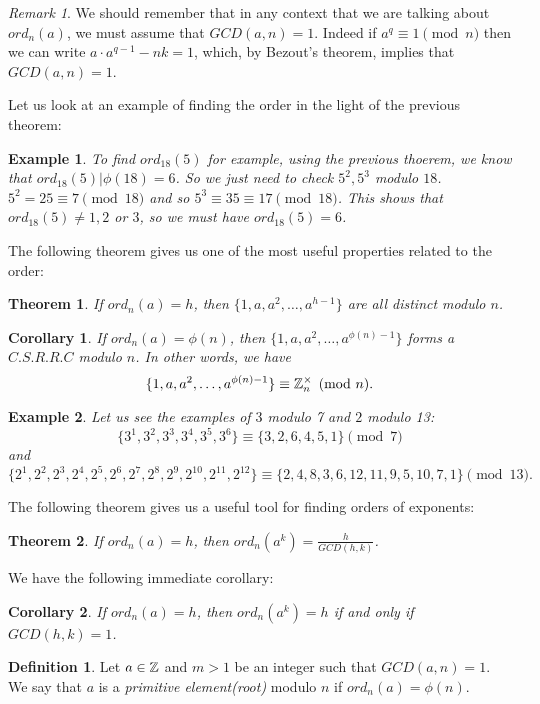 \documentclass[12pt]{article}
\theoremstyle{plain}
\newtheorem{corollary}{Corollary}
\newtheorem{example}{Example}
\newtheorem{theorem}{Theorem}
\theoremstyle{definition}
\newtheorem{definition}{Definition}
\theoremstyle{remark}
\newtheorem{remark}{Remark}
\begin{document}
\begin{remark}
We should remember that in any context that we are talking about $ord_n(a)$, we must assume that $GCD(a,n)=1$. Indeed if $a^q\equiv 1 \pmod {n}$ then we can write $a\cdot a^{q-1}-nk=1$, which, by Bezout's theorem, implies that $GCD(a,n)=1$.
\end{remark}
Let us look at an example of finding the order in the light of the previous theorem:
\begin{example}
To find $ord_{18}(5)$ for example, using the previous thoerem, we know that $ord_{18}(5)|\phi(18)=6$. So we just need to check $5^2, 5^3$ modulo $18$. $5^2=25 \equiv 7 \pmod{18}$ and so $5^3 \equiv 35 \equiv 17 \pmod{18}$. This shows that $ord_{18}(5)\neq 1, 2$ or $3$, so we must have $ord_{18}(5)=6$.
\end{example}

\bigskip
\noindent

The following theorem gives us one of the most useful properties related to the order:
\begin{theorem}
If $ord_n(a)=h$, then $\{1,a,a^2, \dots, a^{h-1}\}$ are all distinct modulo $n$.
\end{theorem}

\begin{corollary}
If $ord_n(a)=\phi(n)$, then $\{1,a, a^2, \dots, a^{\phi(n)-1}\}$ forms a $C.S.R.R.C$ modulo $n$. In other words, we have
$$\{1,a, a^2, \dots, a^{\phi(n)-1}\} \equiv \mathbb{Z}_n^{\times} \pmod{n}.$$
\end{corollary}
\begin{example}
Let us see the examples of $3$ modulo 7 and $2$ modulo 13:
$$\{3^1, 3^2, 3^3, 3^4, 3^5, 3^6\} \equiv \{3, 2, 6, 4, 5, 1\} \pmod{7}$$ and
$$\{2^1, 2^2, 2^3, 2^4, 2^5, 2^6, 2^7, 2^8, 2^9, 2^{10}, 2^{11}, 2^{12}\} \equiv \{2, 4, 8, 3, 6, 12, 11, 9, 5, 10, 7, 1\} \pmod{13}.$$
\end{example}

\bigskip
\noindent
The following theorem gives us a useful tool for finding orders of exponents:
\begin{theorem}
If $ord_n(a)=h$, then $ord_n(a^k) = \frac{h}{GCD(h,k)}$.
\end{theorem}

\bigskip
\noindent
We have the following immediate corollary:
\begin{corollary}
If $ord_{n}(a)=h$, then $ord_n(a^k)=h$ if and only if $GCD(h,k)=1$.
\end{corollary}

\bigskip
\noindent
\begin{definition}
Let $a\in \mathbb{Z}$ and $m>1$ be an integer such that $GCD(a,n)=1$. We say that $a$ is a {\it primitive element(root)} modulo $n$ if $ord_n(a)=\phi(n)$.
\end{definition}
\end{document}
